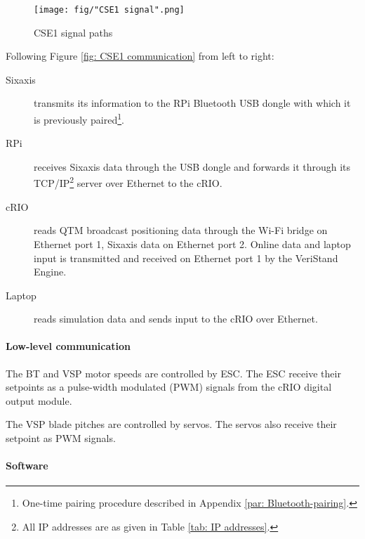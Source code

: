 \documentclass[a4paper,twoside,english]{report}
\begin{document}
\begin{figure}
\begin{centering}
\texttt{[image: fig/"CSE1 signal".png]}
\par\end{centering}
\caption{\label{fig: CSE1 signal}CSE1 signal paths}
\end{figure}

Following Figure \ref{fig: CSE1 communication} from left to right:
\begin{description}
\item [{Sixaxis}] transmits its information to the RPi Bluetooth USB dongle
with which it is previously paired\footnote{One-time pairing procedure described in Appendix \ref{par: Bluetooth-pairing}.}.
\item [{RPi}] receives Sixaxis data through the USB dongle and forwards
it through its TCP/IP\footnote{All IP addresses are as given in Table \ref{tab: IP addresses}.}
server over Ethernet to the cRIO.
\item [{cRIO}] reads QTM broadcast positioning data through the Wi-Fi bridge
on Ethernet port 1, Sixaxis data on Ethernet port 2. Online data and
laptop input is transmitted and received on Ethernet port 1 by the
VeriStand Engine.
\item [{Laptop}] reads simulation data and sends input to the cRIO over
Ethernet.
\end{description}

\paragraph{Low-level communication}

The BT and VSP motor speeds are controlled by ESC. The ESC receive
their setpoints as a pulse-width modulated (PWM) signals from the
cRIO digital output module.

The VSP blade pitches are controlled by servos. The servos also receive
their setpoint as PWM signals.

\paragraph{Software}
\end{document}
